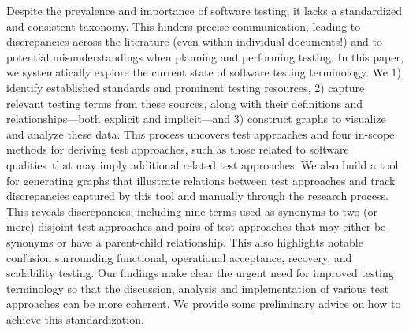 \label{abstract}%
Despite the prevalence and importance of software testing, it lacks
a standardized and consistent taxonomy. This hinders precise communication,
leading to discrepancies across the literature (even within individual
documents!) and to potential misunderstandings when planning and performing
testing. In this paper, we systematically explore the current state of
software testing terminology. We 1) identify established standards
and prominent testing resources, 2) capture relevant testing terms
from these sources, along with their definitions and relationships---both
explicit and implicit---and 3) construct graphs to visualize and analyze
these data. This process uncovers \approachCount{} test approaches and
\ifnotpaper four in-scope methods for deriving test approaches, such as those
    related to \fi \qualityCount{} software qualities\ifnotpaper\else\ that may
    imply additional related test approaches\fi. We also build
a tool for generating graphs that illustrate relations between test
approaches and track discrepancies captured by this tool and manually through
the research process. This reveals \totalDiscreps{} discrepancies,
including nine terms used as synonyms to two (or more) disjoint test approaches
and \parSynCount{} pairs of test approaches that may either be synonyms or have
a parent-child relationship. This also highlights notable confusion surrounding
functional, operational acceptance, recovery, and scalability testing. Our
findings make clear the urgent need for improved testing terminology so that
the discussion, analysis and implementation of various test approaches can be
more coherent. We provide some preliminary advice on how to achieve this
standardization.